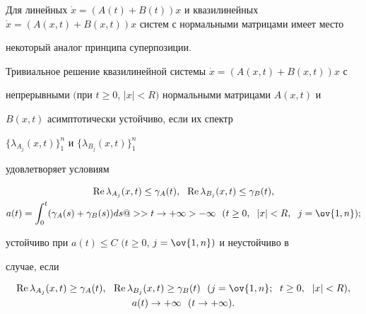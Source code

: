 Для линейных $\Dot x=(A(t)+B(t))x$ и квазилинейных $\Dot 


x=(A(x,t)+B(x,t))x$ систем с нормальными матрицами имеет место 


некоторый аналог принципа суперпозиции.





\begin{thm}


Тривиальное решение квазилинейной системы $\Dot x=(A(x,t)+B(x,t))x$ с 


непрерывными $($при $t\ge0$, $|x|<R)$ нормальными матрицами $A(x,t)$ и 


$B(x,t)$ асимптотически устойчиво, если их спектр 


$\{\lambda_{A_j}(x,t)\}^n_1$ и $\{\lambda_{B_j}(x,t)\}^n_1$ 


удовлетворяет условиям


\begin{gather*}


\re\lambda_{A_j}(x,t)\le \gamma_A(t),\ \


\re\lambda_{B_j}(x,t)\le\gamma_B(t),\\


a(t)=\int^t_0 (\gamma_A(s)+\gamma_B(s))ds


@>>{t\to+\infty}>-\infty\ \ (t\ge0,\ \; |x|<R,\ \; j=\ov{1,n});


\end{gather*}


устойчиво при $a(t)\le C$ $(t\ge0$, $j=\ov{1,n})$ и неустойчиво в 


случае, если


\begin{gather*}


\re\lambda_{A_j}(x,t)\ge\gamma_A(t),\ \


\re\lambda_{B_j}(x,t)\ge\gamma_B(t)\ \ (j=\ov{1,n};


\ \; t\ge0,\ \; |x|<R),\\


a(t)\to+\infty\ \ (t\to+\infty).


\end{gather*}


\end{thm}





